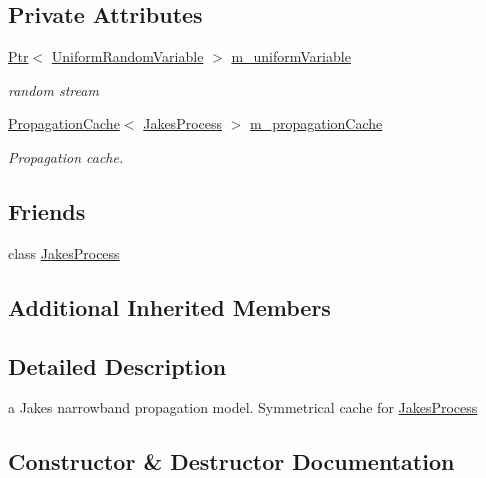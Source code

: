 \subsection*{Private Attributes}
\begin{DoxyCompactItemize}
\item 
\hyperlink{classns3_1_1Ptr}{Ptr}$<$ \hyperlink{classns3_1_1UniformRandomVariable}{Uniform\+Random\+Variable} $>$ \hyperlink{classns3_1_1JakesPropagationLossModel_a8271aba351f52e1d87c92d8f0f26ddae}{m\+\_\+uniform\+Variable}
\begin{DoxyCompactList}\small\item\em random stream \end{DoxyCompactList}\item 
\hyperlink{classns3_1_1PropagationCache}{Propagation\+Cache}$<$ \hyperlink{classns3_1_1JakesProcess}{Jakes\+Process} $>$ \hyperlink{classns3_1_1JakesPropagationLossModel_a4b5341c01d569a9e7b5274eae017126d}{m\+\_\+propagation\+Cache}
\begin{DoxyCompactList}\small\item\em Propagation cache. \end{DoxyCompactList}\end{DoxyCompactItemize}
\subsection*{Friends}
\begin{DoxyCompactItemize}
\item 
class \hyperlink{classns3_1_1JakesPropagationLossModel_a6038e98faf969357bc5669579aa2fd04}{Jakes\+Process}
\end{DoxyCompactItemize}
\subsection*{Additional Inherited Members}


\subsection{Detailed Description}
a Jakes narrowband propagation model. Symmetrical cache for \hyperlink{classns3_1_1JakesProcess}{Jakes\+Process} 

\subsection{Constructor \& Destructor Documentation}
